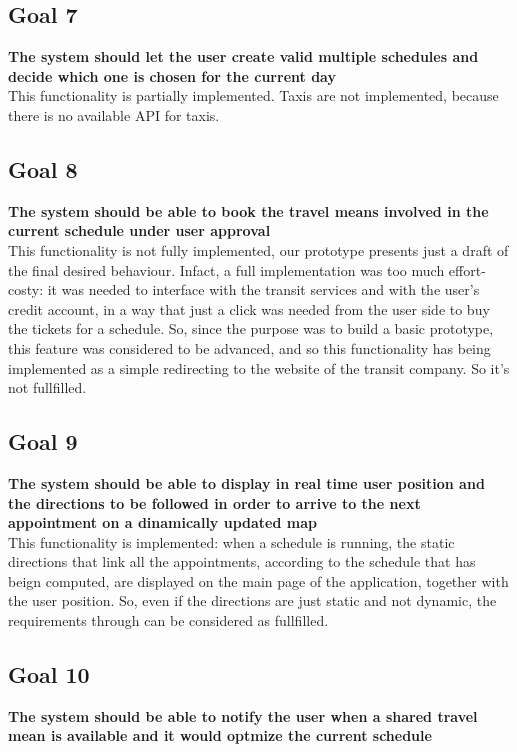 \subsection{Goal 7} \label{subsect:gScheduleCreation}
\textbf{The system should let the user create valid multiple schedules and decide which one is chosen for the current day}\\

This functionality is partially implemented. Taxis are not implemented, because there is no available API for taxis.

\subsection{Goal 8} \label{subsect:gScheduleSelection}
\textbf{The system should be able to book the travel means involved in the current schedule under user approval}\\

This functionality is not fully implemented, our prototype presents just a draft of the final desired behaviour. Infact, a full implementation was too much effort-costy: it was needed to interface with the transit services and with the user's credit account, in a way that just a click was needed from the user side to buy the tickets for a schedule. So, since the purpose was to build a basic prototype, this feature was considered to be advanced, and so this functionality has being implemented as a simple redirecting to the website of the transit company. So  it's not fullfilled.

\subsection{Goal 9} \label{subsect:gDirections}
\textbf{The system should be able to display in real time user position and the directions to be followed in order to arrive to the next appointment on a dinamically updated map}\\

This functionality is implemented: when a schedule is running, the static directions that link all the appointments, according to the schedule that has beign computed, are displayed on the main page of the application, together with the user position. So, even if the directions are just static and not dynamic, the requirements  through  can be considered as fullfilled.

\subsection{Goal 10} \label{subsect:gSharedTMNotifications}
\textbf{The system should be able to notify the user when a shared travel mean is available and it would optmize the current schedule}\\

